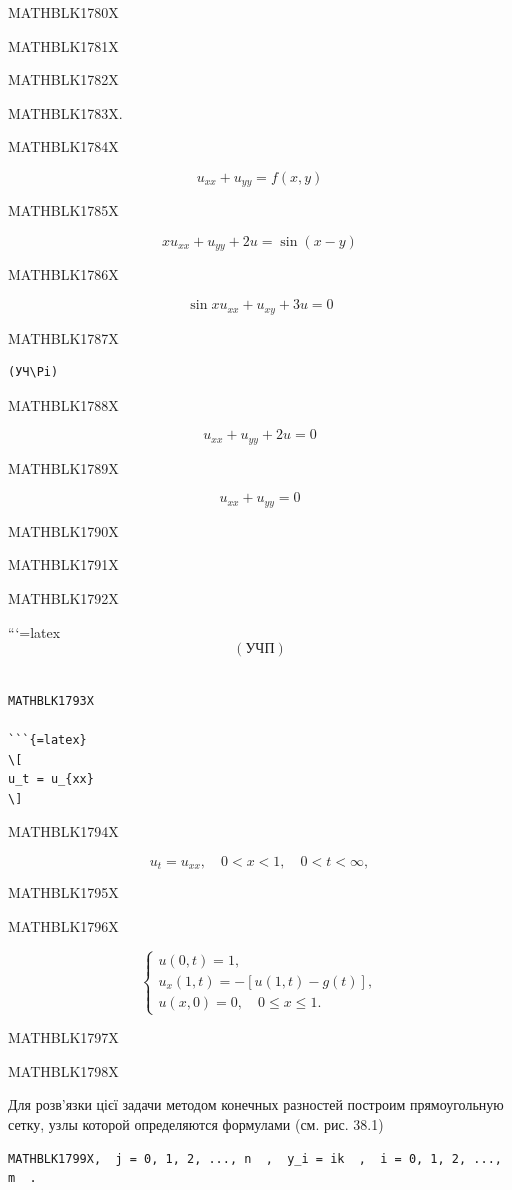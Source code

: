 \documentclass[
  ukrainian,
]{article}
\begin{document}
MATHBLK1780X

MATHBLK1781X

MATHBLK1782X

MATHBLK1783X.

MATHBLK1784X

\[
u_{xx} + u_{yy} = f(x, y)
\]

MATHBLK1785X

\[
xu_{xx} + u_{yy} + 2u = \sin(x - y)
\]

MATHBLK1786X

\[
\sin xu_{xx} + u_{xy} + 3u = 0
\]

MATHBLK1787X

\begin{verbatim}
(УЧ\Pi)
\end{verbatim}

MATHBLK1788X

\[
u_{xx} + u_{yy} + 2u = 0
\]

MATHBLK1789X

\[
u_{xx} + u_{yy} = 0
\]

MATHBLK1790X

MATHBLK1791X

MATHBLK1792X

```{=latex}
\[
(\text{УЧП})
\]

\begin{verbatim}

MATHBLK1793X

```{=latex}
\[
u_t = u_{xx}
\]
\end{verbatim}

MATHBLK1794X

\[
u_t = u_{xx}, \quad 0 < x < 1, \quad 0 < t < \infty,
\]

MATHBLK1795X

MATHBLK1796X

\[
\begin{cases} u(0, t) = 1, \\ u_x(1, t) = -[u(1, t) - g(t)], \\ u(x, 0) = 0, \quad 0 \le x \le 1. \end{cases}
\]

MATHBLK1797X

MATHBLK1798X

Для розв'язки цієї задачи методом конечных разностей построим
прямоугольную сетку, узлы которой определяются формулами (см. рис. 38.1)

\begin{verbatim}
MATHBLK1799X,  j = 0, 1, 2, ..., n  ,  y_i = ik  ,  i = 0, 1, 2, ..., m  .
\end{verbatim}
\end{document}
